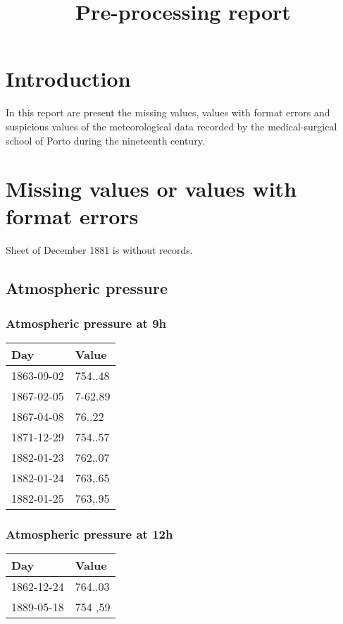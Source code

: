 \documentclass[]{article}
\title{Pre-processing report}
\author{}
\date{}
\begin{document}
\maketitle

{
\setcounter{tocdepth}{6}
\tableofcontents
}
\section{Introduction}\label{introduction}

In this report are present the missing values, values with format errors
and suspicious values of the meteorological data recorded by the
medical-surgical school of Porto during the nineteenth century.

\section{Missing values or values with format
errors}\label{missing-values-or-values-with-format-errors}

Sheet of December 1881 is without records.

\subsection{Atmospheric pressure}\label{atmospheric-pressure}

\subsubsection{Atmospheric pressure at
9h}\label{atmospheric-pressure-at-9h}

\begin{longtable}[]{@{}ll@{}}
\toprule
Day & Value\tabularnewline
\midrule
\endhead
1863-09-02 & 754..48\tabularnewline
1867-02-05 & 7-62.89\tabularnewline
1867-04-08 & 76..22\tabularnewline
1871-12-29 & 754..57\tabularnewline
1882-01-23 & 762,.07\tabularnewline
1882-01-24 & 763,.65\tabularnewline
1882-01-25 & 763,.95\tabularnewline
\bottomrule
\end{longtable}

\subsubsection{Atmospheric pressure at
12h}\label{atmospheric-pressure-at-12h}

\begin{longtable}[]{@{}ll@{}}
\toprule
Day & Value\tabularnewline
\midrule
\endhead
1862-12-24 & 764..03\tabularnewline
1889-05-18 & 754 ,59\tabularnewline
\bottomrule
\end{longtable}
\end{document}
